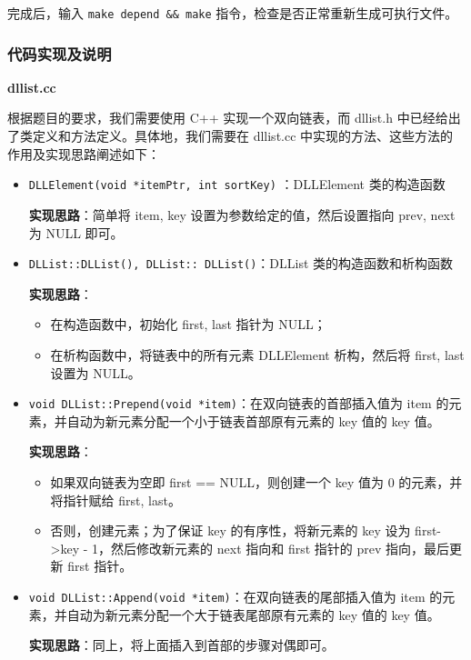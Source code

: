 \documentclass[a4paper,12pt]{article}
\begin{document}
\par 完成后，输入 \texttt{make depend && make} 指令，检查是否正常重新生成可执行文件。

\subsubsection{代码实现及说明}

\par \textbf{dllist.cc}

根据题目的要求，我们需要使用 C++ 实现一个双向链表，而 dllist.h 中已经给出了类定义和方法定义。具体地，我们需要在 dllist.cc 中实现的方法、这些方法的作用及实现思路阐述如下：

\begin{itemize}
\item \texttt{DLLElement(void *itemPtr, int sortKey)} ：DLLElement 类的构造函数
\par \textbf{实现思路}：简单将 item, key 设置为参数给定的值，然后设置指向 prev, next 为 NULL 即可。
\item \texttt{DLList::DLList(), DLList::~DLList()}：DLList 类的构造函数和析构函数
\par \textbf{实现思路}：
\begin{itemize}
  \item 在构造函数中，初始化 first, last 指针为 NULL；
  \item 在析构函数中，将链表中的所有元素 DLLElement 析构，然后将 first, last 设置为 NULL。
\end{itemize}
\item \texttt{void DLList::Prepend(void *item)}：在双向链表的首部插入值为 item 的元素，并自动为新元素分配一个小于链表首部原有元素的 key 值的 key 值。
\par \textbf{实现思路}：
\begin{itemize}
  \item 如果双向链表为空即 first == NULL，则创建一个 key 值为 0 的元素，并将指针赋给 first, last。
  \item 否则，创建元素；为了保证 key 的有序性，将新元素的 key 设为 first->key - 1，然后修改新元素的 next 指向和 first 指针的 prev 指向，最后更新 first 指针。
\end{itemize}
\item \texttt{void DLList::Append(void *item)}：在双向链表的尾部插入值为 item 的元素，并自动为新元素分配一个大于链表尾部原有元素的 key 值的 key 值。
\par \textbf{实现思路}：同上，将上面插入到首部的步骤对偶即可。

\end{itemize}
\end{document}

